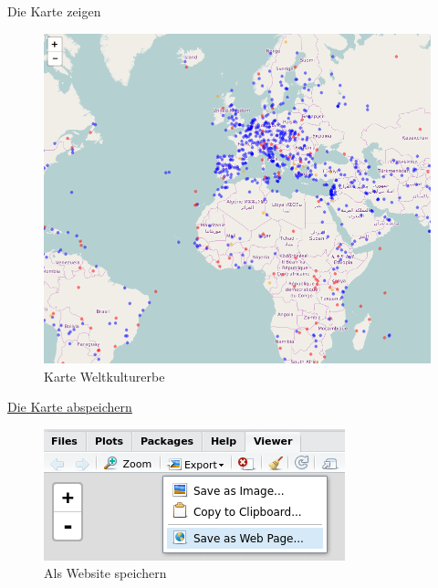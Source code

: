 \documentclass[ignorenonframetext,]{beamer}
\begin{document}
\begin{frame}{Die Karte zeigen}
\protect\hypertarget{die-karte-zeigen-1}{}

\begin{figure}
\centering
\includegraphics{figure/WHCcircles.PNG}
\caption{Karte Weltkulturerbe}
\end{figure}

\end{frame}

\begin{frame}{\href{http://www.r-bloggers.com/interactive-mapping-with-leaflet-in-r-2/}{Die
Karte abspeichern}}
\protect\hypertarget{die-karte-abspeichern}{}

\begin{figure}
\centering
\includegraphics{figure/snapshot2.png}
\caption{Als Website speichern}
\end{figure}

\end{frame}
\end{document}

